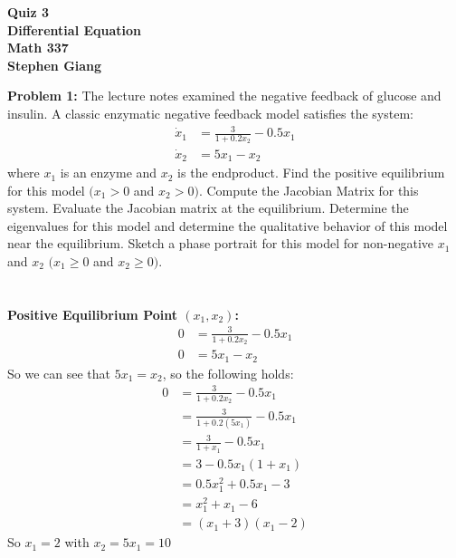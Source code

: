 \documentclass[12pt]{article}
\begin{document}
	
	\begin{center}
		\textbf{Quiz 3} \\
		\textbf{Differential Equation} \\
		\textbf{Math 337} \\
		\textbf{Stephen Giang} \\
	\end{center}

\noindent \textbf{Problem 1: }The lecture notes examined the negative feedback of glucose and insulin. A classic enzymatic negative feedback model satisfies the system:
	\begin{align*}
		\dot{x}_1 &= \frac{3}{1 + 0.2x_2} - 0.5x_1 \\
		\dot{x}_2 &= 5x_1 - x_2
	\end{align*}
where $x_1$ is an enzyme and $x_2$ is the endproduct. Find the positive equilibrium for this model $(x_1 > 0$ and $x_2 > 0)$. Compute the Jacobian Matrix for this system. Evaluate the Jacobian matrix at the equilibrium. Determine the eigenvalues for this model and determine the qualitative behavior of this model near the equilibrium. Sketch a phase portrait for this model for non-negative $x_1$ and $x_2$ $(x_1 \geq 0$ and $x_2 \geq 0)$.
\\ \\ \\
\noindent \textbf{Positive Equilibrium Point $(x_1,x_2)$: }
	\begin{align*}
		0 &= \frac{3}{1 + 0.2x_2} - 0.5x_1 \\
		0 &= 5x_1 - x_2
	\end{align*}	
So we can see that $5x_1 = x_2$, so the following holds: 
	\begin{align*}
		0 &= \frac{3}{1 + 0.2x_2} - 0.5x_1 \\
		&= \frac{3}{1 + 0.2(5x_1)} - 0.5x_1 \\
		&= \frac{3}{1 + x_1} - 0.5x_1 \\
		&= 3 - 0.5x_1(1 + x_1) \\
		&= 0.5x_1^2 + 0.5x_1 - 3 \\
		&= x_1^2 + x_1 - 6 \\
		&= (x_1 + 3)(x_1 - 2)
	\end{align*}	
So $x_1 = 2$ with $x_2 = 5x_1 = 10$ 

\newpage
\end{document}
